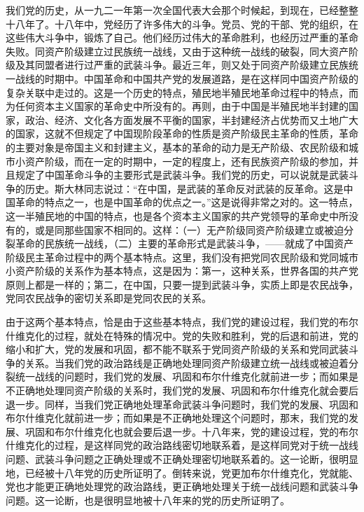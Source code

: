 我们党的历史，从一九二一年第一次全国代表大会那个时候起，到现在，已经整整十八年了。十八年中，党经历了许多伟大的斗争。党员、党的干部、党的组织，在这些伟大斗争中，锻炼了自己。他们经历过伟大的革命胜利，也经历过严重的革命失败。同资产阶级建立过民族统一战线，又由于这种统一战线的破裂，同大资产阶级及其同盟者进行过严重的武装斗争。最近三年，则又处于同资产阶级建立民族统一战线的时期中。中国革命和中国共产党的发展道路，是在这样同中国资产阶级的复杂关联中走过的。这是一个历史的特点，殖民地半殖民地革命过程中的特点，而为任何资本主义国家的革命史中所没有的。再则，由于中国是半殖民地半封建的国家，政治、经济、文化各方面发展不平衡的国家，半封建经济占优势而又土地广大的国家，这就不但规定了中国现阶段革命的性质是资产阶级民主革命的性质，革命的主要对象是帝国主义和封建主义，基本的革命的动力是无产阶级、农民阶级和城市小资产阶级，而在一定的时期中，一定的程度上，还有民族资产阶级的参加，并且规定了中国革命斗争的主要形式是武装斗争。我们党的历史，可以说就是武装斗争的历史。斯大林同志说过：“在中国，是武装的革命反对武装的反革命。这是中国革命的特点之一，也是中国革命的优点之一。”这是说得非常之对的。这一特点，这一半殖民地的中国的特点，也是各个资本主义国家的共产党领导的革命史中所没有的，或是同那些国家不相同的。这样：（一）无产阶级同资产阶级建立或被迫分裂革命的民族统一战线，（二）主要的革命形式是武装斗争，——就成了中国资产阶级民主革命过程中的两个基本特点。这里，我们没有把党同农民阶级和党同城市小资产阶级的关系作为基本特点，这是因为：第一，这种关系，世界各国的共产党原则上都是一样的；第二，在中国，只要一提到武装斗争，实质上即是农民战争，党同农民战争的密切关系即是党同农民的关系。

由于这两个基本特点，恰是由于这些基本特点，我们党的建设过程，我们党的布尔什维克化的过程，就处在特殊的情况中。党的失败和胜利，党的后退和前进，党的缩小和扩大，党的发展和巩固，都不能不联系于党同资产阶级的关系和党同武装斗争的关系。当我们党的政治路线是正确地处理同资产阶级建立统一战线或被迫着分裂统一战线的问题时，我们党的发展、巩固和布尔什维克化就前进一步；而如果是不正确地处理同资产阶级的关系时，我们党的发展、巩固和布尔什维克化就会要后退一步。同样，当我们党正确地处理革命武装斗争问题时，我们党的发展、巩固和布尔什维克化就前进一步；而如果是不正确地处理这个问题时，那末，我们党的发展、巩固和布尔什维克化也就会要后退一步。十八年来，党的建设过程，党的布尔什维克化的过程，是这样同党的政治路线密切地联系着，是这样同党对于统一战线问题、武装斗争问题之正确处理或不正确处理密切地联系着的。这一论断，很明显地，已经被十八年党的历史所证明了。倒转来说，党更加布尔什维克化，党就能、党也才能更正确地处理党的政治路线，更正确地处理关于统一战线问题和武装斗争问题。这一论断，也是很明显地被十八年来的党的历史所证明了。

